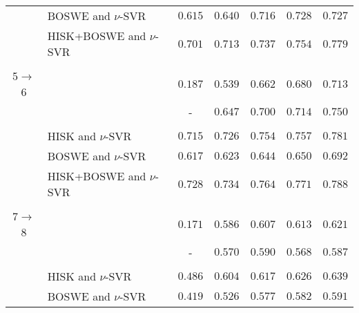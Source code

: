 \documentclass[11pt,a4paper]{article}
\begin{document}
\begin{table*}[!t]
\begin{center}
\begin{tabular}{clccccc}
											& BOSWE and $\nu$-SVR								& $0.615$ 					& $0.640$ 				
																				& $0.716$ 					& $0.728$					& $0.727$\\

											& HISK+BOSWE and $\nu$-SVR						& $0.701$ 					& $0.713$ 				
																				& $\mathbf{0.737}$ 	& $\mathbf{0.754}$	& $\mathbf{0.779}$\\
\hline
\vspace{-0.9em}\\
5$\rightarrow$6					& \cite{Phandi-EMNLP-2015}							& $0.187$ 					& $0.539$ 				
																				& $0.662$ 					& $0.680$					& $0.713$\\
																				
											& \cite{Dong-EMNLP-2016}								& - 								& $0.647$ 				
																				& $0.700$ 					& $0.714$					& $0.750$\\
\cline{2-7}
\vspace{-0.9em}\\

											& HISK and $\nu$-SVR										& $0.715$ 					& $0.726$ 				
																				& $0.754$ 					& $0.757$					& $0.781$\\

											& BOSWE and $\nu$-SVR								& $0.617$ 					& $0.623$ 				
																				& $0.644$ 					& $0.650$					& $0.692$\\

											& HISK+BOSWE and $\nu$-SVR						& $\mathbf{0.728}$ 	& $\mathbf{0.734}$ 				
																				& $\mathbf{0.764}$ 	& $\mathbf{0.771}$	& $\mathbf{0.788}$\\
\hline
\vspace{-0.9em}\\
7$\rightarrow$8					& \cite{Phandi-EMNLP-2015}							& $0.171$ 					& $0.586$ 				
																				& $0.607$ 					& $0.613$					& $0.621$\\
																				
											& \cite{Dong-EMNLP-2016}								& - 								& $0.570$ 				
																				& $0.590$ 					& $0.568$					& $0.587$\\
\cline{2-7}
\vspace{-0.9em}\\

											& HISK and $\nu$-SVR										& $0.486$ 					& $0.604$ 				
																				& $0.617$ 					& $0.626$					& $0.639$\\

											& BOSWE and $\nu$-SVR								& $0.419$ 					& $0.526$ 				
																				& $0.577$ 					& $0.582$					& $0.591$\\


\end{tabular}
\end{center}
\end{table*}
\end{document}
